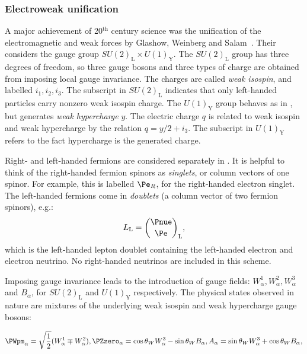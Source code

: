 \subsubsection{Electroweak unification}

A major achievement of 20$^{\textrm{th}}$ century science was the unification of the electromagnetic and weak forces by Glashow, Weinberg and Salam~\cite{GlashowPartialSymmetries,WeinbergModelOfLeptons,SalamNobelSymposium}. %
Their \EWT considers the gauge group $SU(2)_{\textrm{L}} \times U(1)_{\textrm{Y}}$. The $SU(2)_{\textrm{L}}$ group has three degrees of freedom, so three gauge bosons and three types of charge are obtained from imposing local gauge invariance. The charges are called \emph{weak isospin}, and labelled $i_1, i_2, i_3$. The subscript in $SU(2)_{\textrm{L}}$ indicates that only left-handed particles carry nonzero weak isospin charge. The $U(1)_{\textrm{Y}}$ group behaves as in \QED, but generates \emph{weak hypercharge} $y$. The electric charge $q$ is related to weak isospin and weak hypercharge by the relation $q=y/2 + i_3$. The subscript in $U(1)_{\textrm{Y}}$ refers to the fact hypercharge is the generated charge.

Right- and left-handed fermions are considered separately in \EWT. It is helpful to think of the right-handed fermion spinors as \emph{singlets}, or column vectors of one spinor. For example, this is labelled $\Pe_{R}$, for the right-handed electron singlet.
The left-handed fermions come in \emph{doublets} (a column vector of two fermion spinors), e.g.:
$$
L_{\textrm{L}}=\binom{\Pnue}{\Pe}_{\textrm{L}},
$$
which is the left-handed lepton doublet containing the left-handed electron and electron neutrino. No right-handed neutrinos are included in this scheme. 

Imposing gauge invariance leads to the introduction of gauge fields: $W_{\alpha}^{1},W_{\alpha}^{2},W_{\alpha}^{3}$ and $B_{\alpha}$, for $SU(2)_{\textrm{L}}$ and $U(1)_{\textrm{Y}}$ respectively. The physical states observed in nature are mixtures of the underlying weak isospin and weak hypercharge gauge bosons:

\begin{equation}
\label{eq:th:electroweak_gauge_bosons}
\PWpm_{\alpha} = \sqrt{\frac{1}{2}}(W_{\alpha}^{1} \mp W_{\alpha}^{2}) ,\\
\PZzero_{\alpha} = \cos \theta_{W} W_{\alpha}^{3} - \sin \theta_{W} B_{\alpha} ,\\
A_{\alpha} = \sin \theta_{W} W_{\alpha}^{3} + \cos \theta_{W} B_{\alpha} ,
\end{equation}

